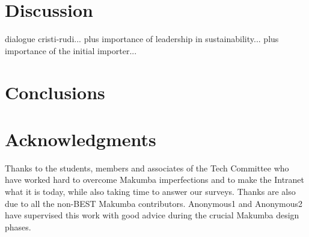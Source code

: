 \documentclass{acm_proc_article-sp}
\begin{document}
\section{Discussion}\label{sec:disco}
dialogue cristi-rudi... plus importance of leadership in sustainability... plus importance of the initial importer...


\section{Conclusions}\label{sec:conclusions}

\section{Acknowledgments}\label{sec:acknowledgments}
Thanks to the students, members and associates of the Tech Committee who have worked hard to overcome Makumba imperfections and to make the Intranet what it is today, while also taking time to answer our surveys.  Thanks are also due to all the non-BEST Makumba contributors.  Anonymous1 and Anonymous2 have supervised this work with good advice during the crucial Makumba design phases.

%

 

%

\balancecolumns
\end{document}
